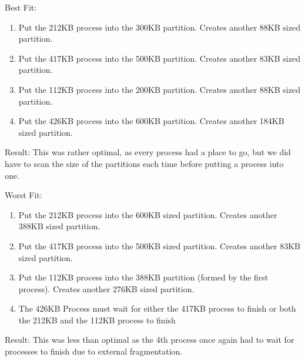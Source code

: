 \documentclass{article}
\begin{document}
Best Fit:
\begin{enumerate}
    \item Put the 212KB process into the 300KB partition. Creates another 88KB sized partition.
    \item Put the 417KB process into the 500KB partition. Creates another 83KB sized partition.
    \item Put the 112KB process into the 200KB partition. Creates another 88KB sized partition.
    \item Put the 426KB process into the 600KB partition. Creates another 184KB sized partition.
\end{enumerate}
Result: This was rather optimal, as every process had a place to go, but we did have to scan the size of the partitions each time before putting a process into one.
\vspace{5mm}

Worst Fit:
\begin{enumerate}
    \item Put the 212KB process into the 600KB sized partition. Creates another 388KB sized partition.
    \item Put the 417KB process into the 500KB sized partition. Creates another 83KB sized partition.
    \item Put the 112KB process into the 388KB partition (formed by the first process). Creates another 276KB sized partition.
    \item The 426KB Process must wait for either the 417KB process to finish or both the 212KB and the 112KB process to finish
\end{enumerate}
Result: This was less than optimal as the 4th process once again had to wait for processes to finish due to external fragmentation.
    
\end{document}
